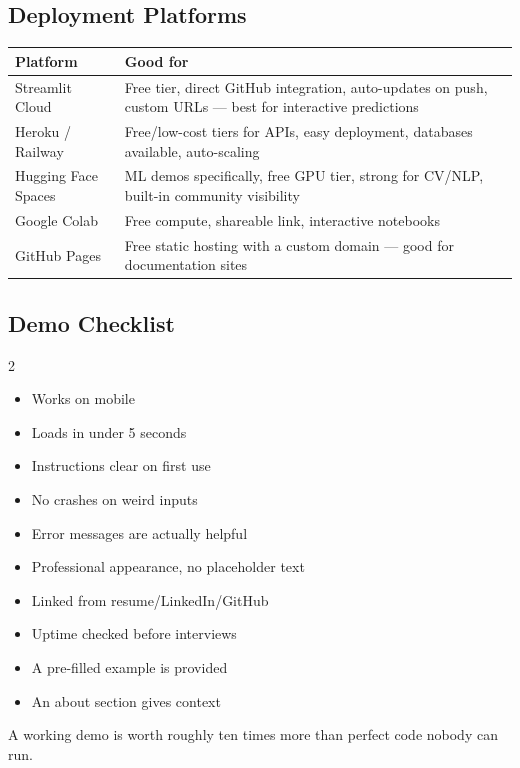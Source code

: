 \subsection{Deployment Platforms}

\begin{longtable}{p{} p{}}
\toprule
\textbf{Platform} & \textbf{Good for} \\
\midrule
\endhead
Streamlit Cloud & Free tier, direct GitHub integration, auto-updates on push, custom URLs --- best for interactive
predictions \\
Heroku / Railway & Free/low-cost tiers for APIs, easy deployment, databases available, auto-scaling \\
Hugging Face Spaces & ML demos specifically, free GPU tier, strong for CV/NLP, built-in community visibility \\
Google Colab & Free compute, shareable link, interactive notebooks \\
GitHub Pages & Free static hosting with a custom domain --- good for documentation sites \\
\bottomrule
\end{longtable}

\subsection{Demo Checklist}

\begin{multicols}{2}
\begin{itemize}[nosep]
  \item Works on mobile
  \item Loads in under 5 seconds
  \item Instructions clear on first use
  \item No crashes on weird inputs
  \item Error messages are actually helpful
  \item Professional appearance, no placeholder text
  \item Linked from resume/LinkedIn/GitHub
  \item Uptime checked before interviews
  \item A pre-filled example is provided
  \item An about section gives context
\end{itemize}
\end{multicols}

\begin{keytakeaway}
A working demo is worth roughly ten times more than perfect code nobody can run.
\end{keytakeaway}

